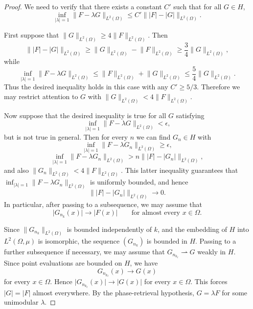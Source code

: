 \documentclass[11pt]{amsart}
\theoremstyle{definition}
\theoremstyle{remark}
\begin{document}
\begin{proof}
We need to verify that there exists a constant \(C'\) such that for all
\(G\in H\),
\[
\inf_{\lvert \lambda \rvert=1}\lVert F-\lambda G \rVert_{L^2(\Omega)}
\le
C'\lVert \lvert F \rvert-\lvert G \rvert \rVert_{L^2(\Omega)}.
\]

First suppose that \(\lVert G \rVert_{L^2(\Omega)}\ge4\lVert F \rVert_{L^2(\Omega)}\).
Then
\[
\lVert \lvert F \rvert-\lvert G \rvert \rVert_{L^2(\Omega)}
\ge
\lVert G \rVert_{L^2(\Omega)}-\lVert F \rVert_{L^2(\Omega)}
\ge
\frac34\lVert G \rVert_{L^2(\Omega)},
\]
while
\[
\inf_{\lvert \lambda \rvert=1}\lVert F-\lambda G \rVert_{L^2(\Omega)}
\le
\lVert F \rVert_{L^2(\Omega)}+\lVert G \rVert_{L^2(\Omega)}
\le
\frac54\lVert G \rVert_{L^2(\Omega)}.
\]
Thus the desired inequality holds in this case with any \(C'\ge5/3\).
Therefore we may restrict attention to \(G\) with
\(\lVert G \rVert_{L^2(\Omega)}<4\lVert F \rVert_{L^2(\Omega)}\).

Now suppose that the desired inequality is true for all \(G\) satisfying
\[
\inf_{\lvert \lambda \rvert=1}\lVert F-\lambda G \rVert_{L^2(\Omega)}<\epsilon,
\]
but is not true in general. Then for every \(n\) we can find \(G_n\in H\)
with
\[
\inf_{\lvert \lambda \rvert=1}\lVert F-\lambda G_n \rVert_{L^2(\Omega)}\ge\epsilon,
\]
\[
\inf_{\lvert \lambda \rvert=1}\lVert F-\lambda G_n \rVert_{L^2(\Omega)}
>
n\lVert \lvert F \rvert-\lvert G_n \rvert \rVert_{L^2(\Omega)},
\]
and also \(\lVert G_n \rVert_{L^2(\Omega)}<4\lVert F \rVert_{L^2(\Omega)}\). This latter
inequality guarantees that
\(\inf_{\lvert \lambda \rvert=1}\lVert F-\lambda G_n \rVert_{L^2(\Omega)}\) is uniformly
bounded, and hence
\[
\lVert \lvert F \rvert-\lvert G_n \rvert \rVert_{L^2(\Omega)}\to0.
\]
In particular, after passing to a subsequence, we may assume that
\[
\lvert G_{n_k}(x) \rvert\to\lvert F(x) \rvert
\qquad\text{for almost every }x\in\Omega.
\]

Since \(\lVert G_{n_k} \rVert_{L^2(\Omega)}\) is bounded independently of \(k\), and
the embedding of \(H\) into \(L^2(\Omega,\mu)\) is isomorphic, the sequence
\((G_{n_k})\) is bounded in \(H\). Passing to a further subsequence if
necessary, we may assume that \(G_{n_{k_\ell}}\rightharpoonup G\) weakly in
\(H\). Since point evaluations are bounded on \(H\), we have
\[
G_{n_{k_\ell}}(x)\to G(x)
\]
for every \(x\in\Omega\). Hence \(\lvert G_{n_{k_\ell}}(x) \rvert\to\lvert G(x) \rvert\) for
every \(x\in\Omega\). This forces \(\lvert G \rvert=\lvert F \rvert\) almost everywhere. By the
phase-retrieval hypothesis, \(G=\lambda F\) for some unimodular \(\lambda\).


\end{proof}
\end{document}
